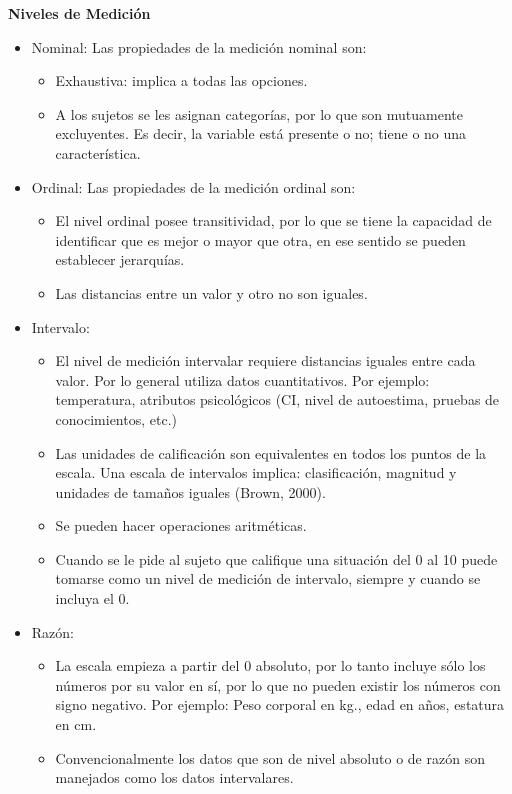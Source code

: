 \textbf{Niveles de Medici\'on}

\begin{itemize}
    \item Nominal: Las propiedades de la medici\'on nominal son:
    \begin{itemize}
        \item Exhaustiva: implica a todas las opciones.
        \item A los sujetos se les asignan categor\'ias, por lo que son mutuamente excluyentes. Es decir, la variable est\'a presente o no; tiene o no una caracter\'istica.
    \end{itemize}
    \item Ordinal: Las propiedades de la medici\'on ordinal son:
    \begin{itemize}
        \item El nivel ordinal posee transitividad, por lo que se tiene la capacidad de identificar que es mejor o mayor que otra, en ese sentido se pueden establecer jerarqu\'ias.
        \item Las distancias entre un valor y otro no son iguales.
    \end{itemize}
    \item Intervalo: 
    \begin{itemize}
        \item El nivel de medici\'on intervalar requiere distancias iguales entre cada valor. Por lo general utiliza datos cuantitativos. Por ejemplo: temperatura, atributos psicol\'ogicos (CI, nivel de autoestima, pruebas de conocimientos, etc.)
        \item Las unidades de calificaci\'on son equivalentes en todos los puntos de la escala. Una escala de intervalos implica: clasificaci\'on, magnitud y unidades de tama\~nos iguales (Brown, 2000).
        \item Se pueden hacer operaciones aritm\'eticas.
        \item Cuando se le pide al sujeto que califique una situaci\'on del 0 al 10 puede tomarse como un nivel de medici\'on de intervalo, siempre y cuando se incluya el 0.
    \end{itemize}
    \item Raz\'on: 
    \begin{itemize}
        \item La escala empieza a partir del 0 absoluto, por lo tanto incluye s\'olo los n\'umeros por su valor en s\'i, por lo que no pueden existir los n\'umeros con signo negativo. Por ejemplo: Peso corporal en kg., edad en a\~nos, estatura en cm.
        \item Convencionalmente los datos que son de nivel absoluto o de raz\'on son manejados como los datos intervalares.
    \end{itemize}
\end{itemize}

